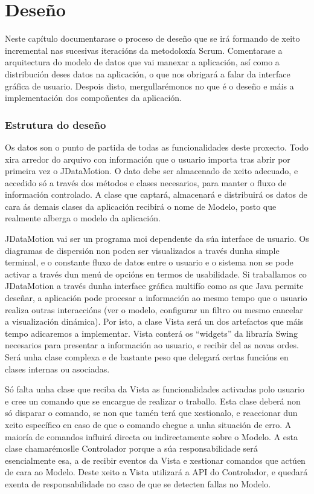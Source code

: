 \chapter{Deseño}

Neste capítulo documentarase o proceso de deseño que se irá formando de xeito incremental nas sucesivas iteracións da metodoloxía Scrum. Comentarase a arquitectura do modelo de datos que vai manexar a aplicación, así como a distribución deses datos na aplicación, o que nos obrigará a falar da interface gráfica de usuario. Despois disto, mergullarémonos no que é o deseño e máis a implementación dos compoñentes da aplicación.

\subsection{Estrutura do deseño}

Os datos son o punto de partida de todas as funcionalidades deste proxecto. Todo xira arredor do arquivo con información que o usuario importa tras abrir por primeira vez o JDataMotion. O dato debe ser almacenado de xeito adecuado, e accedido só a través dos métodos e clases necesarios, para manter o fluxo de información controlado. A clase que captará, almacenará e distribuirá os datos de cara ás demais clases da aplicación recibirá o nome de Modelo, posto que realmente alberga o modelo da aplicación.

JDataMotion vai ser un programa moi dependente da súa interface de usuario. Os diagramas de dispersión non poden ser visualizados a través dunha simple terminal, e o constante fluxo de datos entre o usuario e o sistema non se pode activar a través dun menú de opcións en termos de usabilidade. Si traballamos co JDataMotion a través dunha interface gráfica multifío como as que Java permite deseñar, a aplicación pode procesar a información ao mesmo tempo que o usuario realiza outras interaccións (ver o modelo, configurar un filtro ou mesmo cancelar a visualización dinámica). Por isto, a clase Vista será un dos artefactos que máis tempo adicaremos a implementar. Vista conterá os ``widgets'' da libraría Swing necesarios para presentar a información ao usuario, e recibir del as novas ordes. Será unha clase complexa e de bastante peso que delegará certas funcións en clases internas ou asociadas.

Só falta unha clase que reciba da Vista as funcionalidades activadas polo usuario e cree un comando que se encargue de realizar o traballo. Esta clase deberá non só disparar o comando, se non que tamén terá que xestionalo, e reaccionar dun xeito específico en caso de que o comando chegue a unha situación de erro. A maioría de comandos influirá directa ou indirectamente sobre o Modelo. A esta clase chamarémoslle Controlador porque a súa responsabilidade será esencialmente esa, a de recibir eventos da Vista e xestionar comandos que actúen de cara ao Modelo. Deste xeito a Vista utilizará a API do Controlador, e quedará exenta de responsabilidade no caso de que se detecten fallas no Modelo.

